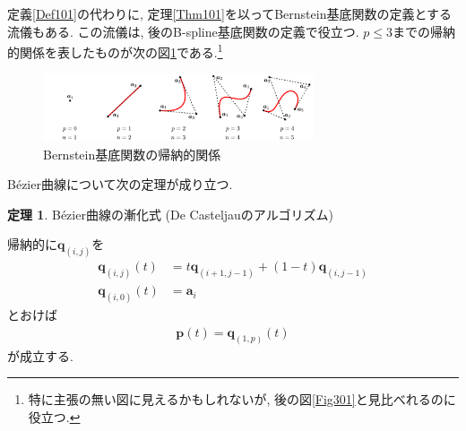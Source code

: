 \documentclass{jsarticle}
\theoremstyle{definition}%
\newtheorem{thm}{定理}
\begin{document}
定義\ref{Def101}の代わりに, 定理\ref{Thm101}を以ってBernstein基底関数の定義とする流儀もある.
この流儀は, 後のB-spline基底関数の定義で役立つ.
$p\le 3$までの帰納的関係を表したものが次の図\ref{Fig102}である.\footnote{特に主張の無い図に見えるかもしれないが, 後の図\ref{Fig301}と見比べれるのに役立つ.}
\begin{figure}[H]
	\centering
    \includegraphics[page=2,clip,width=80mm]{fig.pdf}
	\caption{Bernstein基底関数の帰納的関係}
	\label{Fig102}
\end{figure}
B\'ezier曲線について次の定理が成り立つ.
\begin{screen}
	\begin{thm}
		\label{Thm105}
		B\'ezier曲線の漸化式 (De Casteljauのアルゴリズム)

        帰納的に$\bm{q}_{(i,j)}$を
		\begin{align}
			\bm{q}_{(i,j)}(t)&=t\bm{q}_{(i+1,j-1)}+(1-t)\bm{q}_{(i,j-1)} \\
			\bm{q}_{(i,0)}(t)&=\bm{a}_i
		\end{align}
		とおけば
		\begin{align}
			\label{Eqn105}
			\bm{p}(t)=\bm{q}_{(1,p)}(t)
		\end{align}
		が成立する.
	\end{thm}
\end{screen}
\end{document}
